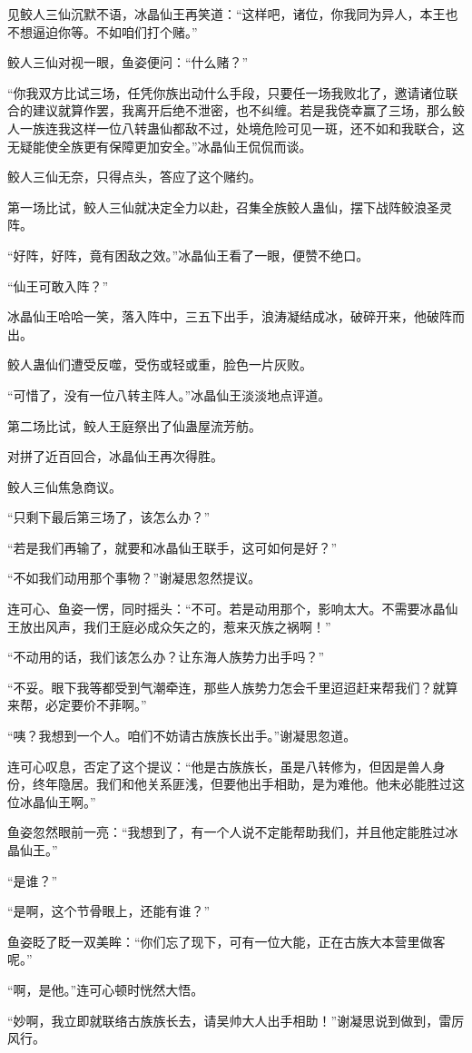 \begin{this_body}
见鲛人三仙沉默不语，冰晶仙王再笑道：“这样吧，诸位，你我同为异人，本王也不想逼迫你等。不如咱们打个赌。”

鲛人三仙对视一眼，鱼姿便问：“什么赌？”

“你我双方比试三场，任凭你族出动什么手段，只要任一场我败北了，邀请诸位联合的建议就算作罢，我离开后绝不泄密，也不纠缠。若是我侥幸赢了三场，那么鲛人一族连我这样一位八转蛊仙都敌不过，处境危险可见一斑，还不如和我联合，这无疑能使全族更有保障更加安全。”冰晶仙王侃侃而谈。

鲛人三仙无奈，只得点头，答应了这个赌约。

第一场比试，鲛人三仙就决定全力以赴，召集全族鲛人蛊仙，摆下战阵鲛浪圣灵阵。

“好阵，好阵，竟有困敌之效。”冰晶仙王看了一眼，便赞不绝口。

“仙王可敢入阵？”

冰晶仙王哈哈一笑，落入阵中，三五下出手，浪涛凝结成冰，破碎开来，他破阵而出。

鲛人蛊仙们遭受反噬，受伤或轻或重，脸色一片灰败。

“可惜了，没有一位八转主阵人。”冰晶仙王淡淡地点评道。

第二场比试，鲛人王庭祭出了仙蛊屋流芳舫。

对拼了近百回合，冰晶仙王再次得胜。

鲛人三仙焦急商议。

“只剩下最后第三场了，该怎么办？”

“若是我们再输了，就要和冰晶仙王联手，这可如何是好？”

“不如我们动用那个事物？”谢凝思忽然提议。

连可心、鱼姿一愣，同时摇头：“不可。若是动用那个，影响太大。不需要冰晶仙王放出风声，我们王庭必成众矢之的，惹来灭族之祸啊！”

“不动用的话，我们该怎么办？让东海人族势力出手吗？”

“不妥。眼下我等都受到气潮牵连，那些人族势力怎会千里迢迢赶来帮我们？就算来帮，必定要价不菲啊。”

“咦？我想到一个人。咱们不妨请古族族长出手。”谢凝思忽道。

连可心叹息，否定了这个提议：“他是古族族长，虽是八转修为，但因是兽人身份，终年隐居。我们和他关系匪浅，但要他出手相助，是为难他。他未必能胜过这位冰晶仙王啊。”

鱼姿忽然眼前一亮：“我想到了，有一个人说不定能帮助我们，并且他定能胜过冰晶仙王。”

“是谁？”

“是啊，这个节骨眼上，还能有谁？”

鱼姿眨了眨一双美眸：“你们忘了现下，可有一位大能，正在古族大本营里做客呢。”

“啊，是他。”连可心顿时恍然大悟。

“妙啊，我立即就联络古族族长去，请吴帅大人出手相助！”谢凝思说到做到，雷厉风行。

\end{this_body}

